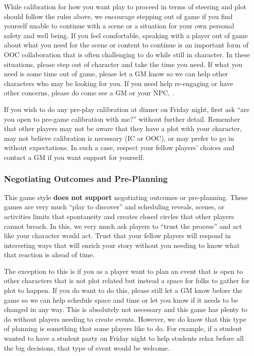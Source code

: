 \documentclass[sheet]{GL2020}
\begin{document}
While calibration for how you want play to proceed in terms of steering and plot should follow the rules above, we encourage stepping out of game if you find yourself unable to continue with a scene or a situation for your own personal safety and well being. If you feel comfortable, speaking with a player out of game about what you need for the scene or content to continue is an important form of OOC collaboration that is often challenging to do while still in character. In these situations, please step out of character and take the time you need. If what you need is some time out of game, please let a GM know so we can help other characters who may be looking for you. If you need help re-engaging or have other concerns, please do come see a GM or your NPC, \cPrincipal{}.

If you wish to do any pre-play calibration at dinner on Friday night, first ask ``are you open to pre-game calibration with me?'' without further detail. Remember that other players may not be aware that they have a plot with your character, may not believe calibration is necessary (IC or OOC), or may prefer to go in without expectations. In such a case, respect your fellow players' choices and contact a GM if you want support for yourself.

\subsubsection{Negotiating Outcomes and Pre-Planning}
This game style \textbf{does not support} negotiating outcomes or pre-planning. These games are very much ``play to discover'' and scheduling reveals, scenes, or activities limits that spontaneity and creates closed circles that other players cannot breach. In this, we very much ask players to ``trust the process'' and act like your character would act. Trust that your fellow players will respond in interesting ways that will enrich your story without you needing to know what that reaction is ahead of time.

The exception to this is if you as a player want to plan an event that is open to other characters that is not plot related but instead a space for folks to gather for plot to happen. If you do want to do this, please still let a GM know before the game so we can help schedule space and time or let you know if it needs to be changed in any way. This is absolutely not necessary and this game has plenty to do without players needing to create events. However, we do know that this type of planning is something that some players like to do. For example, if a student wanted to have a student party on Friday night to help students relax before all the big decisions, that type of event would be welcome.
\end{document}
